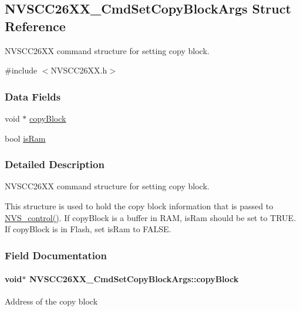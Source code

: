 \subsection{N\+V\+S\+C\+C26\+X\+X\+\_\+\+Cmd\+Set\+Copy\+Block\+Args Struct Reference}
\label{struct_n_v_s_c_c26_x_x___cmd_set_copy_block_args}


N\+V\+S\+C\+C26\+X\+X command structure for setting copy block.  




{\ttfamily \#include $<$N\+V\+S\+C\+C26\+X\+X.\+h$>$}

\subsubsection*{Data Fields}
\begin{DoxyCompactItemize}
\item 
void $\ast$ \hyperlink{struct_n_v_s_c_c26_x_x___cmd_set_copy_block_args_ac10668f5d0518ae03b89459dad27caff}{copy\+Block}
\item 
bool \hyperlink{struct_n_v_s_c_c26_x_x___cmd_set_copy_block_args_ae5d8cf9c7fd9fcc7ab27f03f6310df68}{is\+Ram}
\end{DoxyCompactItemize}


\subsubsection{Detailed Description}
N\+V\+S\+C\+C26\+X\+X command structure for setting copy block. 

This structure is used to hold the copy block information that is passed to \hyperlink{_n_v_s_8h_adb26bd05e4f063191411ac5ad968b1d9}{N\+V\+S\+\_\+control()}. If copy\+Block is a buffer in R\+A\+M, is\+Ram should be set to T\+R\+U\+E. If copy\+Block is in Flash, set is\+Ram to F\+A\+L\+S\+E. 

\subsubsection{Field Documentation}
\paragraph[{copy\+Block}]{\setlength{\rightskip}{0pt plus 5cm}void$\ast$ N\+V\+S\+C\+C26\+X\+X\+\_\+\+Cmd\+Set\+Copy\+Block\+Args\+::copy\+Block}\label{struct_n_v_s_c_c26_x_x___cmd_set_copy_block_args_ac10668f5d0518ae03b89459dad27caff}
Address of the copy block 
